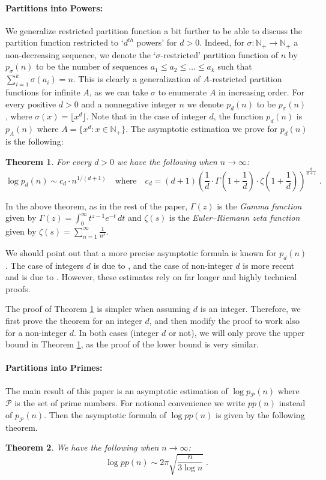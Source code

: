 \documentclass[11pt]{article}
\theoremstyle{plain}
\newtheorem{theorem}{Theorem}[section]
\begin{document}
\paragraph{Partitions into Powers:} We generalize restricted partition function a bit further to be able to discuss the partition function restricted to `$d^{th}$ powers' for $d>0$. Indeed, for $\sigma\colon \mathbb{N}_+\to \mathbb{N}_+$ a non-decreasing sequence, we denote the `$\sigma$-restricted' partition function of $n$ by $p_{\sigma}(n)$ to be the number of sequences $a_1\leq a_2\leq \ldots \leq a_k$ such that $\sum_{i=1}^{k}\sigma(a_i)=n$.
This is clearly a generalization of $A$-restricted partition functions for infinite $A$, as we can take $\sigma$ to enumerate $A$ in increasing order.
For every positive $d>0$ and a nonnegative integer $n$ we denote $p_d(n)$ to be $p_{\sigma}(n)$, where $\sigma(x)=\lfloor x^{d} \rfloor$.
Note that in the case of integer $d$, the function $p_d(n)$ is $p_A(n)$ where $A=\{x^{d}:x\in \mathbb{N}_+\}$. The asymptotic estimation we prove for $p_d(n)$ is the following:
\begin{theorem}\label{thm:powers}
For every $d>0$ we have the following when $n\to \infty$:
$$
    \log p_{d}(n) \sim c_d \cdot n^{1/(d+1)}\quad\text{where}\quad  c_d=(d+1)\left(\frac{1}{d}\cdot \Gamma\left(1+\frac{1}{d}\right)\cdot \zeta\left(1+\frac{1}{d}\right)\right)^{\frac{d}{d+1}}\;.
$$
\end{theorem}
In the above theorem, as in the rest of the paper, $\Gamma(z)$ is the {\em Gamma function} given by $\Gamma(z) = \int_0^\infty t^{z-1} e^{-t} \,dt$ and $\zeta(s)$ is the {\em Euler–Riemann zeta function} given by $\zeta(s) = \sum_{n=1}^{\infty} \frac{1}{n^s}$.

We should point out that a more precise asymptotic formula is known for $p_d(n)$. The case of integers $d$ is due to \cite{Gaf2016, HR1}, and the case of non-integer $d$ is more recent and is due to \cite{LucRal2016, YaLWu2021, YaLChen2016, YaLChen2018}. However, these estimates rely
on far longer and highly technical proofs.

The proof of Theorem \ref{thm:powers} is simpler when assuming $d$ is an integer. Therefore, we first prove the theorem for an integer $d$, and then modify the proof to work also for a non-integer $d$. In both cases (integer $d$ or not), we will only prove the upper bound in Theorem \ref{thm:powers}, as the proof of the lower bound is very similar.

\paragraph{Partitions into Primes:} The main result of this paper is an asymptotic estimation of $\log p_{\mathcal{P}}(n)$ where $\mathcal{P}$ is the set of prime numbers. For notional convenience we write $pp(n)$ instead of $p_{\mathcal{P}}(n)$. Then the asymptotic formula of $\log pp(n)$ is given by the following theorem.
\begin{theorem}\label{thm:primes}
We have the following when $n\to \infty$:
$$
        \log pp(n) \sim 2\pi\sqrt{\frac{n}{3\log n}}\;.
$$
\end{theorem}
\end{document}

